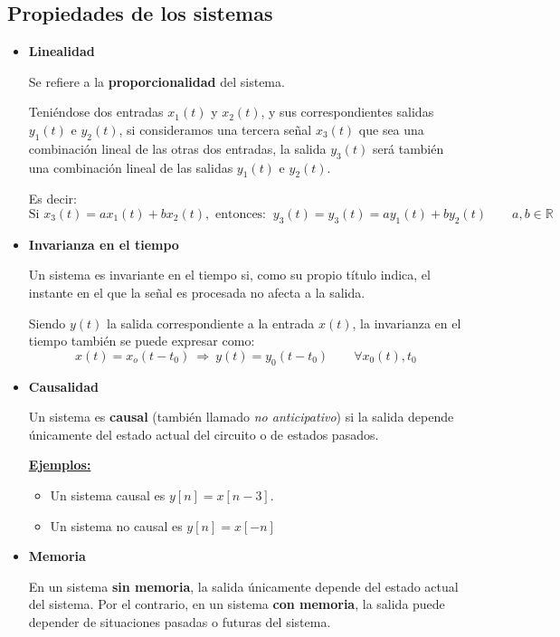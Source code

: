 \documentclass[a4paper]{book}
\begin{document}
\subsection{Propiedades de los sistemas}
\begin{itemize}
	\item \textbf{Linealidad}

	      Se refiere a la \textbf{proporcionalidad} del sistema.

	      Teniéndose dos entradas $x_1(t)$ y $x_2(t)$, y sus correspondientes salidas $y_1(t)$ e $y_2(t)$, si consideramos una tercera señal $x_3(t)$ que sea una combinación lineal de las otras dos entradas, la salida $y_3(t)$ será también una combinación lineal de las salidas $y_1(t)$ e $y_2(t)$.

	      Es decir: \[\text{Si } x_3(t) = ax_1(t) + bx_2(t) , \text{ entonces: }\ y_3(t) = y_3(t) = ay_1(t) + by_2(t) \qquad a,b\in \mathbb{R}\]

	\item \textbf{Invarianza en el tiempo}

	      Un sistema es invariante en el tiempo si, como su propio título indica, el instante en el que la señal es procesada no afecta a la salida.

	      Siendo $y(t)$ la salida correspondiente a la entrada $x(t)$, la invarianza en el tiempo también se puede expresar como: \[x(t)= x_o(t-t_0) \ \Longrightarrow \ y(t)=y_0(t-t_0) \qquad \forall x_0(t), t_0\]


	\item \textbf{Causalidad}

	      Un sistema es \textbf{causal} (también llamado \textsl{no anticipativo}) si la salida depende únicamente del estado actual del circuito o de estados pasados.

	      \underline{\textbf{Ejemplos:}}
	      \begin{itemize}
		      \item Un sistema causal es $y[n] = x[n-3]$.
		      \item Un sistema no causal es $y[n] = x[-n]$
	      \end{itemize}

	\item \textbf{Memoria}

	      En un sistema \textbf{sin memoria}, la salida únicamente depende del estado actual del sistema. Por el contrario, en un sistema \textbf{con memoria}, la salida puede depender de situaciones pasadas o futuras del sistema.


\end{itemize}
\end{document}
